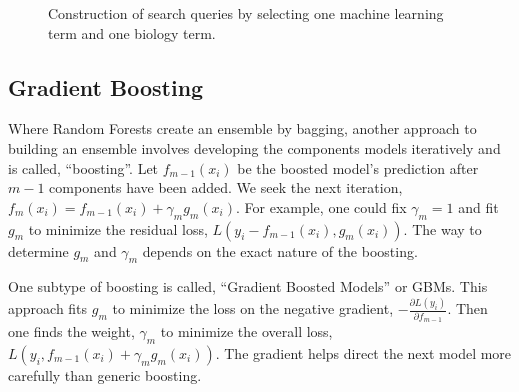 \documentclass{ar-1col-S2O}
\begin{document}
\begin{figure}[htb]
    \caption{Construction of search queries by selecting one machine learning term and one biology term.}
    \label{fig:search}
\end{figure}







\subsection{Gradient Boosting}

Where Random Forests \cite{breiman2001random} create an ensemble by bagging, another approach to building an ensemble involves developing the components models iteratively and is called, ``boosting''.  Let $f_{m-1}(x_i)$ be the boosted model's prediction after $m-1$ components have been added.  We seek the next iteration, $f_m(x_i) = f_{m-1}(x_i) + \gamma_m g_m(x_i)$.  For example, one could fix $\gamma_m=1$ and fit $g_m$ to minimize the residual loss, $L(y_i-f_{m-1}(x_i), g_m(x_i))$.  The way to determine $g_m$ and $\gamma_m$ depends on the exact nature of the boosting.

One subtype of boosting is called, ``Gradient Boosted Models'' \cite{natekin2013gradient} or GBMs. This approach fits $g_m$ to minimize the loss on the negative gradient, $-\frac{\partial L(y_i)}{\partial f_{m-1}}$.  Then one finds the weight, $\gamma_m$ to minimize the overall loss, $L(y_i,f_{m-1}(x_i) + \gamma_m g_m(x_i))$.  The gradient helps direct the next model more carefully than generic boosting.
\end{document}

